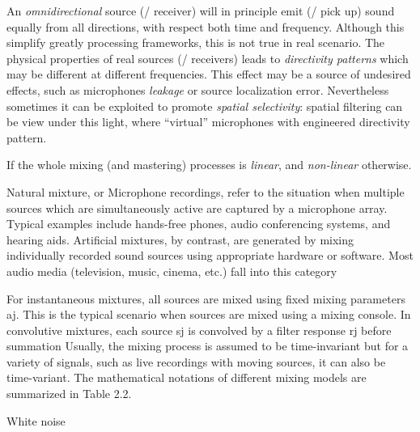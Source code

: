 An \textit{omnidirectional} source (\resp/ receiver) will in principle emit (\resp/ pick up) sound equally from all directions,
with respect both time and frequency.
Although this simplify greatly processing frameworks, this is not true in real scenario.
The physical properties of real sources (\resp/ receivers) leads to \textit{directivity patterns} which may
be different at different frequencies.
This effect may be a source of undesired effects, such as microphones \textit{leakage} or source localization error.
Nevertheless sometimes it can be exploited to promote \textit{spatial selectivity}:
spatial filtering can be view under this light, where ``virtual'' microphones with engineered directivity pattern.


If the whole mixing (and mastering) processes is \textit{linear}, and \textit{non-linear} otherwise.

Natural mixture, or Microphone recordings, refer to the situation when multiple sources which are simultaneously active are captured by a microphone array.
Typical examples include hands-free phones, audio conferencing systems, and hearing aids.
Artificial mixtures, by contrast, are generated by mixing individually recorded sound sources using appropriate hardware or software. Most audio media (television, music, cinema, etc.) fall into this category

For instantaneous mixtures, all sources are mixed using fixed mixing parameters aj.
This is the typical scenario when sources are mixed using a mixing console.
In convolutive mixtures, each source sj is convolved by a filter response rj before summation
Usually, the mixing process is assumed to be time-invariant but for
a variety of signals, such as live recordings with moving sources, it can also be time-variant. The mathematical notations of different mixing models are summarized in Table 2.2.

White noise

